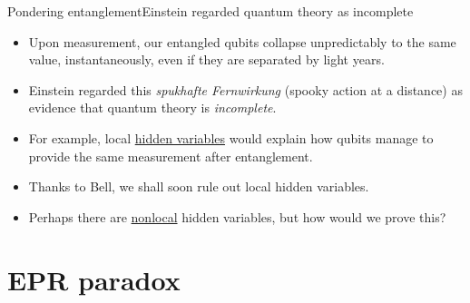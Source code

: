 \begin{frame}{Pondering entanglement}{Einstein regarded quantum theory as incomplete}

\begin{itemize}
    \item<1-> Upon measurement, our entangled qubits collapse unpredictably to the same value, instantaneously, even if they are separated by light years.
    \item<2-> Einstein regarded this \textit{spukhafte Fernwirkung} (spooky action at a distance) as evidence that quantum theory is \emph{incomplete}.
    \item<3-> For example, local \href{https://en.wikipedia.org/wiki/Hidden-variable_theory}{hidden variables} would explain how qubits manage to provide the same measurement after entanglement.
    \item<6-> Thanks to Bell, we shall soon rule out local hidden variables.
    \item<7-> Perhaps there are \href{https://en.wikipedia.org/wiki/Principle_of_locality}{nonlocal} hidden variables, but how would we prove this?
\end{itemize}
    
\end{frame}

\section{EPR paradox}


